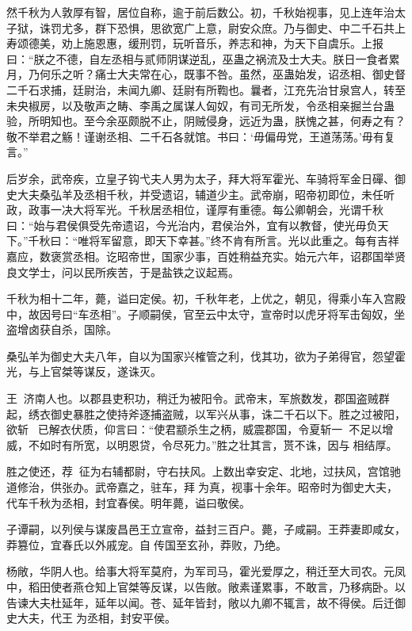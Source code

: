 \documentclass[12pt,UTF8]{ctexbook}
\begin{document}
然千秋为人敦厚有智，居位自称，逾于前后数公。初，千秋始视事，见上连年治太子狱，诛罚尤多，群下恐惧，思欲宽广上意，尉安众庶。乃与御史、中二千石共上寿颂德美，劝上施恩惠，缓刑罚，玩听音乐，养志和神，为天下自虞乐。上报曰：“朕之不德，自左丞相与贰师阴谋逆乱，巫蛊之祸流及士大夫。朕日一食者累月，乃何乐之听？痛士大夫常在心，既事不咎。虽然，巫蛊始发，诏丞相、御史督二千石求捕，廷尉治，未闻九卿、廷尉有所鞫也。曩者，江充先治甘泉宫人，转至未央椒房，以及敬声之畴、李禹之属谋人匈奴，有司无所发，令丞相亲掘兰台蛊验，所明知也。至今余巫颇脱不止，阴贼侵身，远近为蛊，朕愧之甚，何寿之有？敬不举君之觞！谨谢丞相、二千石各就馆。书曰：‘毋偏毋党，王道荡荡。’毋有复言。”



后岁余，武帝疾，立皇子钩弋夫人男为太子，拜大将军霍光、车骑将军金日磾、御史大夫桑弘羊及丞相千秋，并受遗诏，辅道少主。武帝崩，昭帝初即位，未任听政，政事一决大将军光。千秋居丞相位，谨厚有重德。每公卿朝会，光谓千秋曰：“始与君侯俱受先帝遗诏，今光治内，君侯治外，宜有以教督，使光毋负天下。”千秋曰：“唯将军留意，即天下幸甚。”终不肯有所言。光以此重之。每有吉祥嘉应，数褒赏丞相。讫昭帝世，国家少事，百姓稍益充实。始元六年，诏郡国举贤良文学士，问以民所疾苦，于是盐铁之议起焉。



千秋为相十二年，薨，谥曰定侯。初，千秋年老，上优之，朝见，得乘小车入宫殿中，故因号曰“车丞相”。子顺嗣侯，官至云中太守，宣帝时以虎牙将军击匈奴，坐盗增卤获自杀，国除。



桑弘羊为御史大夫八年，自以为国家兴榷管之利，伐其功，欲为子弟得官，怨望霍光，与上官桀等谋反，遂诛灭。



王，济南人也。以郡县吏积功，稍迁为被阳令。武帝末，军旅数发，郡国盗贼群起，绣衣御史暴胜之使持斧逐捕盗贼，以军兴从事，诛二千石以下。胜之过被阳，欲斩，已解衣伏质，仰言曰：“使君颛杀生之柄，威震郡国，令夏斩一，不足以增威，不如时有所宽，以明恩贷，令尽死力。”胜之壮其言，贳不诛，因与相结厚。



胜之使还，荐，征为右辅都尉，守右扶风。上数出幸安定、北地，过扶风，宫馆驰道修治，供张办。武帝嘉之，驻车，拜为真，视事十余年。昭帝时为御史大夫，代车千秋为丞相，封宜春侯。明年薨，谥曰敬侯。



子谭嗣，以列侯与谋废昌邑王立宣帝，益封三百户。薨，子咸嗣。王莽妻即咸女，莽篡位，宜春氏以外戚宠。自传国至玄孙，莽败，乃绝。



杨敞，华阴人也。给事大将军莫府，为军司马，霍光爱厚之，稍迁至大司农。元凤中，稻田使者燕仓知上官桀等反谋，以告敞。敞素谨累事，不敢言，乃移病卧。以告谏大夫杜延年，延年以闻。苍、延年皆封，敞以九卿不辄言，故不得侯。后迁御史大夫，代王为丞相，封安平侯。
\end{document}
